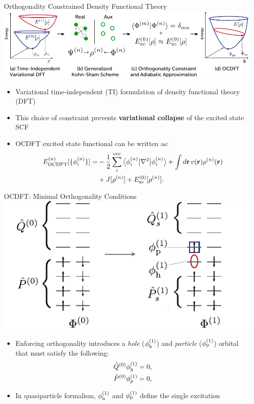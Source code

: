 \documentclass[t]{beamer}
\newcommand{\bra}[2][0]
{\ifthenelse{\equal{#1}{0}}{\left\langle #2 \right|}
{\ifthenelse{\equal{#1}{1}}{\big\langle #2 \big|}
{\ifthenelse{\equal{#1}{2}}{\Big\langle #2 \Big|}
{\ifthenelse{\equal{#1}{3}}{\bigg\langle #2 \bigg|}
{\ifthenelse{\equal{#1}{4}}{\Bigg\langle #2 \Bigg|}
{Error}}}}}
}
\newcommand{\ket}[2][0]
{\ifthenelse{\equal{#1}{0}}{\left| #2 \right\rangle}
{\ifthenelse{\equal{#1}{1}}{\big| #2 \big\rangle}
{\ifthenelse{\equal{#1}{2}}{\Big| #2 \Big\rangle}
{\ifthenelse{\equal{#1}{3}}{\bigg| #2 \bigg\rangle}
{\ifthenelse{\equal{#1}{4}}{\Bigg| #2 \Bigg\rangle}
{Error}}}}}
}
\begin{document}
\begin{frame}{Orthogonality Constrained Density Functional Theory\footnotemark}
\centering
\includegraphics[width=\linewidth]{figure_1.pdf}
\begin{itemize}
\item Variational time-independent (TI) formulation of density functional theory (DFT)
\item This choice of constraint prevents \textbf{variational collapse} of the excited state SCF
\item OCDFT excited state functional can be written as:
\begin{align}
\nonumber
E^{(n)}_{\rm OCDFT}[\{\phi^{(n)}_i\}]=& -\frac{1}{2} \sum_i^{\rm occ} \bra[1]{\phi_i^{(n)}}\nabla^2\ket[1]{\phi_i^{(n)}} + 
\int d \mathbf{r} \, v(\mathbf{r}) \rho^{(n)}(\mathbf{r})\\
 &+ J[\rho^{(n)}] + E^{(0)}_{\rm xc}[\rho^{(n)}].
\end{align}
\end{itemize}
\end{frame}

\begin{frame}{OCDFT: Minimal Orthogonality Conditions}
\centering
\includegraphics[width=0.6\linewidth]{hole_particle_orthogonality.pdf}
\begin{itemize}
\item Enforcing orthogonality introduces a \textit{hole} ($\phi_{\rm h}^{(1)}$) and \textit{particle} ($\phi_{\rm p}^{(1)}$) orbital that must satisfy the following:
\begin{align}
\label{eq:pq_conditions1}
\hat{Q}^{(0)}\phi_{\rm h}^{(1)} = 0,\\
\label{eq:pq_conditions2}
\hat{P}^{(0)}\phi_{\rm p}^{(1)} = 0,
\end{align}
\item In quasiparticle formalism, $\phi_{\rm h}^{(1)}$ and $\phi_{\rm p}^{(1)}$ define the single excitation
\end{itemize}
\end{frame}
\end{document}
